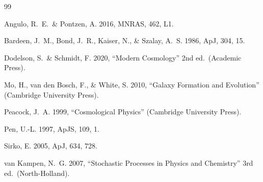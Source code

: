 \documentclass[12pt]{article}
\begin{document}
\begin{thebibliography}{99}

Angulo, R.~E.\ \& Pontzen, A. 2016, MNRAS, 462, L1.

Bardeen, J.~M., Bond, J.~R., Kaiser, N., \& Szalay, A.~S. 1986,
ApJ, 304, 15.

Dodelson, S.\ \& Schmidt, F. 2020, ``Modern Cosmology'' 2nd ed.\
(Academic Press).

Mo, H., van den Bosch, F., \& White, S. 2010, ``Galaxy Formation
and Evolution'' (Cambridge University Press).

Peacock, J.~A. 1999, ``Cosmological Physics'' (Cambridge
University Press).

Pen, U.-L. 1997, ApJS, 109, 1.

Sirko, E. 2005, ApJ, 634, 728.

van Kampen, N.~G. 2007, ``Stochastic Processes in Physics and
Chemistry'' 3rd ed.\ (North-Holland).

\end{thebibliography}
\end{document}
